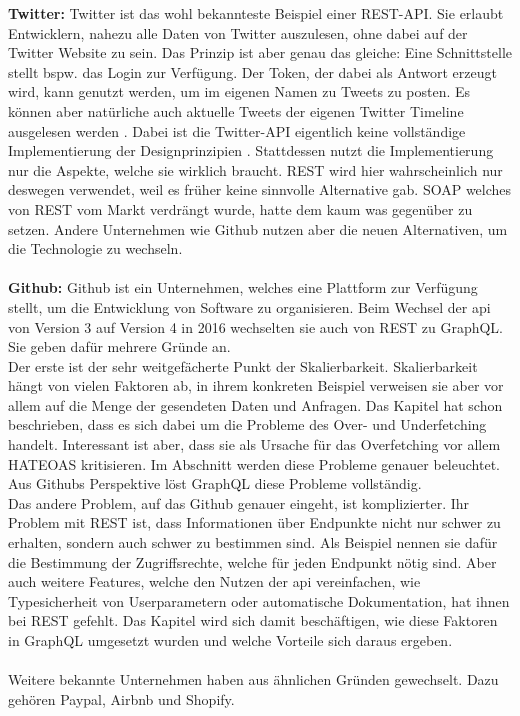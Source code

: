 \textbf{Twitter:} Twitter ist das wohl bekannteste Beispiel einer REST-API. Sie erlaubt Entwicklern, nahezu alle Daten von Twitter auszulesen, ohne dabei auf der Twitter Website zu sein. Das Prinzip ist aber genau das gleiche: Eine Schnittstelle stellt bspw. das Login zur Verfügung. Der Token, der dabei als Antwort erzeugt wird, kann genutzt werden, um im eigenen Namen zu Tweets zu posten. Es können aber natürliche auch aktuelle Tweets der eigenen Twitter Timeline ausgelesen werden \parencite{Twitter2020}. Dabei ist die Twitter-API eigentlich keine vollständige Implementierung der Designprinzipien \parencite{Ullenboom2017}. Stattdessen nutzt die Implementierung nur die Aspekte, welche sie wirklich braucht. \ac{REST} wird hier wahrscheinlich nur deswegen verwendet, weil es früher keine sinnvolle Alternative gab. \ac{SOAP} welches von \ac{REST} vom Markt verdrängt wurde, hatte dem kaum was gegenüber zu setzen. Andere Unternehmen wie Github nutzen aber die neuen Alternativen, um die Technologie zu wechseln.\\
\\
\textbf{Github:} Github ist ein Unternehmen, welches eine Plattform zur Verfügung stellt, um die Entwicklung von Software zu organisieren. Beim Wechsel der \ac{api} von Version 3 auf Version 4 in 2016 wechselten sie auch von \ac{REST} zu GraphQL. Sie geben dafür mehrere Gründe an.\\
Der erste ist der sehr weitgefächerte Punkt der Skalierbarkeit. Skalierbarkeit hängt von vielen Faktoren ab, in ihrem konkreten Beispiel verweisen sie aber vor allem auf die Menge der gesendeten Daten und Anfragen. Das Kapitel  hat schon beschrieben, dass es sich dabei um die Probleme des Over- und Underfetching handelt. Interessant ist aber, dass sie als Ursache für das Overfetching vor allem \ac{HATEOAS} kritisieren. Im Abschnitt  werden diese Probleme genauer beleuchtet. Aus Githubs Perspektive löst GraphQL diese Probleme vollständig.\\
Das andere Problem, auf das Github genauer eingeht, ist komplizierter. Ihr Problem mit \ac{REST} ist, dass Informationen über Endpunkte nicht nur schwer zu erhalten, sondern auch schwer zu bestimmen sind. Als Beispiel nennen sie dafür die Bestimmung der Zugriffsrechte, welche für jeden Endpunkt nötig sind. Aber auch weitere Features, welche den Nutzen der \ac{api} vereinfachen, wie Typesicherheit von Userparametern oder automatische Dokumentation, hat ihnen bei \ac{REST} gefehlt. Das Kapitel  wird sich damit beschäftigen, wie diese Faktoren in GraphQL umgesetzt wurden und welche Vorteile sich daraus ergeben. \parencite{Github2020}
\\
\\
Weitere bekannte Unternehmen haben aus ähnlichen Gründen gewechselt. Dazu gehören Paypal, Airbnb und Shopify.


